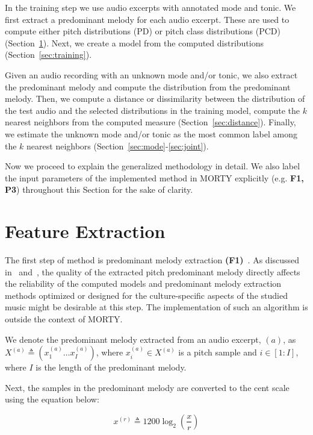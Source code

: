 \documentclass{sig-alternate}
\begin{document}
In the training step we use audio excerpts with annotated mode and tonic. We first extract a predominant me\-lody for each audio excerpt. These are used to compute either pitch distributions (PD) or pitch class distributions (PCD) (Section~\ref{sec:feature}). Next, we create a model from the computed distributions (Section~\ref{sec:training}). 

Given an audio recording with an unknown mode and/or tonic, we also extract the predominant melody and compute the distribution from the predominant melody. Then, we compute a distance or dissimilarity between the distribution of the test audio and the selected distributions in the training model, compute the $k$ nearest neighbors from the computed measure (Section~\ref{sec:distance}). Finally, we estimate the unknown mode and/or tonic as the most common label among the $k$ nearest neighbors (Section~\ref{sec:mode}-\ref{sec:joint}).

Now we proceed to explain the generalized methodology in detail. We also label the input parameters of the implemented method in MORTY explicitly (e.g. {\bf F1, P3}) throughout this Section for the sake of clarity.

\section{Feature Extraction}\label{sec:feature}
The first step of method is predominant melody extraction {\bf(F1)}~\cite{chordia, bozkurt_makam, bozkurt_tonic}. As discussed in~\cite{bozkurt_tonic} and~\cite{atli2014makamFeature_atmm}, the quality of the extracted pitch predominant melody directly affects the reliability of the computed models and predominant melody extraction methods optimized or designed for the culture-specific aspects of the studied music might be desirable at this step. The implementation of such an algorithm is outside the context of MORTY. 

We denote the predominant melody extracted from an audio excerpt, $(a)$, as $X^{(a)}  \triangleq \left(x^{(a)}_1 \dots x^{(a)}_I\right)$, where $x^{(a)}_i \in  X^{(a)}$ is a pitch sample and $i \in [1: I]$, where $I$ is the length of the predominant melody. 

Next, the samples in the predominant melody are converted to the cent scale using the equation below:

\begin{equation}
\label{eq:cent_norm}
x^{(r)}  \triangleq 1200 \log_2\left(\frac{x}{r}\right)
\end{equation}
\end{document}
